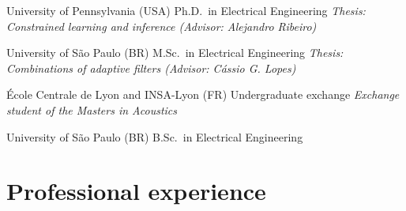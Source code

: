 \documentclass[highlights,publist]{cvlfoc}
\begin{document}
\begin{entrydate}
		{University of Pennsylvania (USA)}
		{Ph.D.\ in Electrical Engineering}
		{\emph{Thesis: Constrained learning and inference
			\hfill(Advisor: Alejandro Ribeiro)}}

		{University of S\~{a}o Paulo (BR)}
		{M.Sc.\ in Electrical Engineering}
		{\emph{Thesis: Combinations of adaptive filters
			\hfill(Advisor: C\'{a}ssio G. Lopes)}}

		{École Centrale de Lyon {\normalfont and} INSA-Lyon (FR)}
		{Undergraduate exchange}
		{\textit{Exchange student of the Masters in Acoustics}}

		{University of S\~{a}o Paulo (BR)}
		{B.Sc.\ in Electrical Engineering}
		{}
\end{entrydate}

\vspace{5mm}


\section*{Professional experience}
\end{document}
